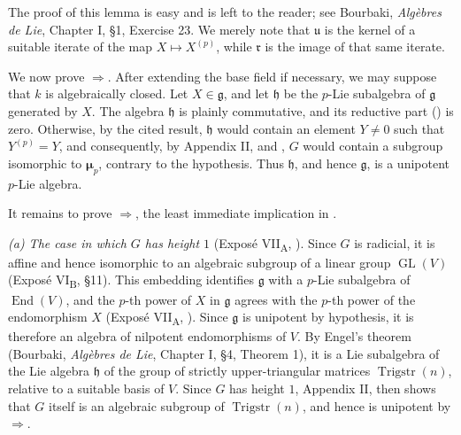 The proof of this lemma is easy and is left to the reader; see
Bourbaki, \emph{Algèbres de Lie}, Chapter I, \S1,
Exercise 23.  We merely note that \(\mathfrak u\) is the kernel of
a suitable iterate of the map \(X\mapsto X^{(p)}\), while
\(\mathfrak r\) is the image of that same iterate.

We now prove \(\Rightarrow\).  After extending the base
field if necessary, we may suppose that \(k\) is algebraically
closed.  Let \(X\in\mathfrak g\), and let \(\mathfrak h\) be the
\(p\)-Lie subalgebra of \(\mathfrak g\) generated by \(X\).  The
algebra \(\mathfrak h\) is plainly commutative, and its reductive
part () is zero.  Otherwise, by the cited result,
\(\mathfrak h\) would contain an element \(Y\ne0\) such that
\(Y^{(p)}=Y\), and consequently, by Appendix II,  and ,
\(G\) would contain a subgroup isomorphic to
\(\boldsymbol\mu_p\), contrary to the hypothesis.  Thus
\(\mathfrak h\), and hence \(\mathfrak g\), is a unipotent
\(p\)-Lie algebra.

It remains to prove \(\Rightarrow\), the least immediate
implication in .

\medskip\noindent\textit{(a) The case in which \(G\) has height
\(1\)} (Exposé VII\textsubscript{A}, ).
Since \(G\) is radicial, it is affine and hence isomorphic to an
algebraic subgroup of a linear group \(\operatorname{GL}(V)\)
(Exposé VI\textsubscript{B}, \S11).  This embedding identifies
\(\mathfrak g\) with a \(p\)-Lie subalgebra of
\(\operatorname{End}(V)\), and the \(p\)-th power of \(X\) in
\(\mathfrak g\) agrees with the \(p\)-th power of the endomorphism
\(X\) (Exposé VII\textsubscript{A}, ).  Since
\(\mathfrak g\) is unipotent by hypothesis, it is therefore an
algebra of nilpotent endomorphisms of \(V\).  By Engel's theorem
(Bourbaki, \emph{Algèbres de Lie}, Chapter I, \S4,
Theorem 1), it is a Lie subalgebra of the Lie algebra
\(\mathfrak h\) of the group of strictly upper-triangular matrices
\(\operatorname{Trigstr}(n)\), relative to a suitable basis of
\(V\).  Since \(G\) has height \(1\), Appendix II,  then shows
that \(G\) itself is an algebraic subgroup of
\(\operatorname{Trigstr}(n)\), and hence is unipotent by
\(\Rightarrow\).


